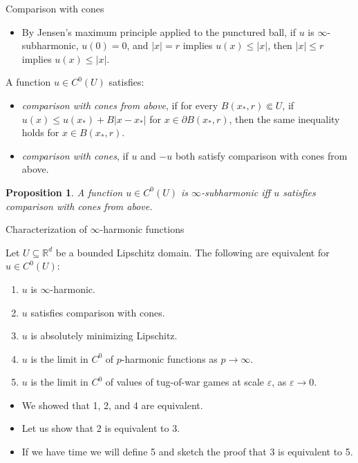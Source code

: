 \documentclass[10pt]{beamer}
\newcommand{\RR}{\mathbb{R}}
\newtheorem{proposition}{Proposition}
\begin{document}
\begin{frame}{Comparison with cones}

\begin{itemize}
\item By Jensen's maximum principle applied to the punctured ball, if $u$ is $\infty$-subharmonic, $u(0) = 0$, and $|x| = r$ implies $u(x) \leq |x|$, then $|x| \leq r$ implies $u(x) \leq |x|$. 
\end{itemize}

\begin{definition}
A function $u \in C^0(U)$ satisfies: 
\begin{itemize}
\item \emph{comparison with cones from above}, if for every $B(x_*, r) \Subset U$, if $u(x) \leq u(x_*) + B|x - x_*|$ for $x \in \partial B(x_*, r)$, then the same inequality holds for $x \in B(x_*, r)$.
\item \emph{comparison with cones}, if $u$ and $-u$ both satisfy comparison with cones from above. 
\end{itemize}
\end{definition}

\begin{proposition}
A function $u \in C^0(U)$ is $\infty$-subharmonic iff $u$ satisfies comparison with cones from above.
\end{proposition}
\end{frame}

\begin{frame}{Characterization of $\infty$-harmonic functions}
\begin{theorem}
Let $U \subseteq \RR^d$ be a bounded Lipschitz domain.
The following are equivalent for $u \in C^0(U)$: 
\begin{enumerate}
\item $u$ is $\infty$-harmonic. 
\item $u$ satisfies comparison with cones. 
\item $u$ is absolutely minimizing Lipschitz. 
\item $u$ is the limit in $C^0$ of $p$-harmonic functions as $p \to \infty$. 
\item $u$ is the limit in $C^0$ of values of tug-of-war games at scale $\varepsilon$, as $\varepsilon \to 0$. 
\end{enumerate}
\end{theorem}
    
\begin{itemize}
    \item We showed that 1, 2, and 4 are equivalent. 
    \item Let us show that 2 is equivalent to 3. 
    \item If we have time we will define 5 and sketch the proof that 3 is equivalent to 5.
\end{itemize}
\end{frame}
\end{document}
